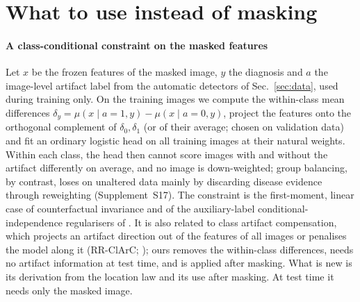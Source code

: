 \section{What to use instead of masking}\label{sec:guide}\label{sec:solution}
\paragraph{A class-conditional constraint on the masked features} Let $x$ be the frozen features of the masked image,
$y$ the diagnosis and $a$ the image-level artifact label from the automatic detectors of Sec.~\ref{sec:data}, used during
training only. On the training images we compute the within-class mean differences
$\delta_y=\mu(x\mid a{=}1,y)-\mu(x\mid a{=}0,y)$, project the features onto the orthogonal complement of $\delta_0,\delta_1$
(or of their average; chosen on validation data) and fit an ordinary logistic head on all training images at their
natural weights. Within each class, the head then cannot score images with and without the artifact differently on
average, and no image is down-weighted; group balancing, by contrast, loses on unaltered data mainly by discarding
disease evidence through reweighting (Supplement~S17). The constraint is the first-moment, linear case of
counterfactual invariance \citep{veitch2021counterfactual} and of the auxiliary-label conditional-independence
regularisers of \citet{makar2022causally}. It is also related to class artifact compensation, which projects an
artifact direction out of the features of all images \citep{anders2022clever} or penalises the model along it
(RR-ClArC; \citealp{pahde2025ensuring}); ours removes the within-class differences, needs no artifact information at
test time, and is applied after masking. What is new is its derivation from the location law and its use after
masking. At test time it needs only the masked image.

